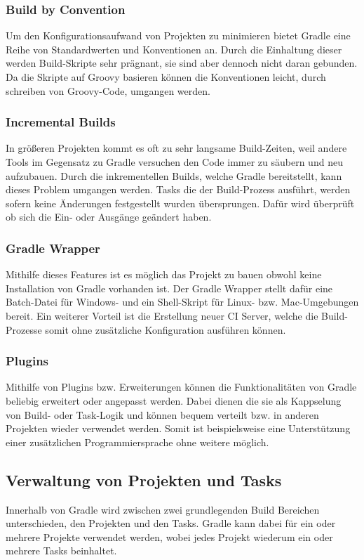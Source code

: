 \subsubsection{Build by Convention}
Um den Konfigurationsaufwand von Projekten zu minimieren bietet Gradle eine Reihe von Standardwerten und Konventionen an. Durch die Einhaltung dieser werden Build-Skripte sehr prägnant, sie sind aber dennoch nicht daran gebunden. Da die Skripte auf Groovy basieren können die Konventionen leicht, durch schreiben von Groovy-Code, umgangen werden.

\subsubsection{Incremental Builds}
In größeren Projekten kommt es oft zu sehr langsame Build-Zeiten, weil andere Tools im Gegensatz zu Gradle versuchen den Code immer zu säubern und neu aufzubauen. Durch die inkrementellen Builds, welche Gradle bereitstellt, kann dieses Problem umgangen werden. Tasks die der Build-Prozess ausführt, werden sofern keine Änderungen festgestellt wurden übersprungen. Dafür wird überprüft ob sich die Ein- oder Ausgänge geändert haben.

\subsubsection{Gradle Wrapper}
Mithilfe dieses Features ist es möglich das Projekt zu bauen obwohl keine Installation von Gradle vorhanden ist. Der Gradle Wrapper stellt dafür eine Batch-Datei für Windows- und ein Shell-Skript für Linux- bzw. Mac-Umgebungen bereit. Ein weiterer Vorteil ist die Erstellung neuer \gls{CI} Server, welche die Build-Prozesse somit ohne zusätzliche Konfiguration ausführen können.

\subsubsection{Plugins}
Mithilfe von Plugins bzw. Erweiterungen können die Funktionalitäten von Gradle beliebig erweitert oder angepasst werden. Dabei dienen die sie als Kappselung von Build- oder Task-Logik und können bequem verteilt bzw. in anderen Projekten wieder verwendet werden. Somit ist beispielsweise eine Unterstützung einer zusätzlichen Programmiersprache ohne weitere möglich.

\subsection{Verwaltung von Projekten und Tasks}
Innerhalb von Gradle  wird zwischen zwei grundlegenden Build Bereichen unterschieden, den Projekten und den Tasks. Gradle kann dabei für ein oder mehrere Projekte verwendet werden, wobei jedes Projekt wiederum ein oder mehrere Tasks beinhaltet.

